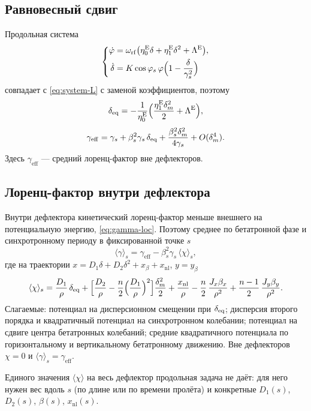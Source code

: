 \subsection{Равновесный сдвиг}

Продольная система
\begin{equation}
\label{eq:system-es-L}
\left\{
\begin{aligned}
\dot\varphi
&=\omega_{\mathrm{rf}}\bigl(\eta_0^{\mathrm{E}}\delta+\eta_1^{\mathrm{E}}\delta^2+\Lambda^{\mathrm{E}}\bigr),\\
\dot\delta
&=K\cos\varphi_s\,\varphi\Bigl(1-\frac{\delta}{\gamma_s^2}\Bigr)
\end{aligned}
\right.
\end{equation}
совпадает с \eqref{eq:system-L} с заменой коэффициентов, поэтому
\begin{equation}
\label{eq:deq-es-L}
\delta_{\mathrm{eq}}
=-\frac{1}{\eta_0^{\mathrm{E}}}
\Bigl(\frac{\eta_1^{\mathrm{E}}\delta_m^2}{2}+\Lambda^{\mathrm{E}}\Bigr),
\end{equation}
\begin{equation}
\label{eq:gamma-es-L}
\gamma_{\mathrm{eff}}
=\gamma_s+\beta_s^2\gamma_s\,\delta_{\mathrm{eq}}
+\frac{\beta_s^2\delta_m^2}{4\gamma_s}
+O(\delta_m^4).
\end{equation}
Здесь $\gamma_{\mathrm{eff}}$ --- средний лоренц-фактор вне дефлекторов.

\subsection{Лоренц-фактор внутри дефлектора}
\label{sec:es-gamma-in}

Внутри дефлектора кинетический лоренц-фактор меньше внешнего на потенциальную энергию, \eqref{eq:gamma-loc}. Поэтому среднее по бетатронной фазе и синхротронному периоду в фиксированной точке $s$
\begin{equation}
\label{eq:gamma-loc-avg}
\langle\gamma\rangle_s
=\gamma_{\mathrm{eff}}-\beta_s^2\gamma_s\,\langle\chi\rangle_s,
\end{equation}
где на траектории $x=D_1\delta+D_2\delta^2+x_\beta+x_{\mathrm{nl}}$, $y=y_\beta$
\begin{equation}
\label{eq:psi-avg-s}
\langle\chi\rangle_s
=\frac{D_1}{\rho}\,\delta_{\mathrm{eq}}
+\Bigl[\frac{D_2}{\rho}-\frac{n}{2}\Bigl(\frac{D_1}{\rho}\Bigr)^2\Bigr]\frac{\delta_m^2}{2}
+\frac{x_{\mathrm{nl}}}{\rho}
-\frac{n}{2}\,\frac{J_x\beta_x}{\rho^2}
+\frac{n-1}{2}\,\frac{J_y\beta_y}{\rho^2}.
\end{equation}
Слагаемые: потенциал на дисперсионном смещении при $\delta_{\mathrm{eq}}$; дисперсия второго порядка и квадратичный потенциал на синхротронном колебании; потенциал на сдвиге центра бетатронных колебаний; средние квадратичного потенциала по горизонтальному и вертикальному бетатронному движению. Вне дефлекторов $\chi=0$ и $\langle\gamma\rangle_s=\gamma_{\mathrm{eff}}$.

Единого значения $\langle\chi\rangle$ на весь дефлектор продольная задача не даёт: для него нужен вес вдоль $s$ (по длине или по времени пролёта) и конкретные $D_1(s)$, $D_2(s)$, $\beta(s)$, $x_{\mathrm{nl}}(s)$.
